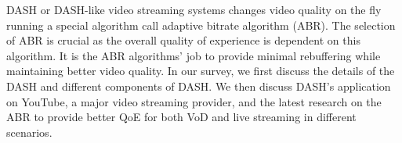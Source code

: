 DASH or DASH-like video streaming systems changes video quality on the fly running a special algorithm call adaptive bitrate algorithm (ABR). The selection of ABR is crucial as the overall quality of experience is dependent on this algorithm. It is the ABR algorithms' job to provide minimal rebuffering while maintaining better video quality. In our survey, we first discuss the details of the DASH and different components of DASH. We then discuss DASH's application on YouTube, a major video streaming provider, and the latest research on the ABR to provide better QoE for both VoD and live streaming in different scenarios.

%
%
%
